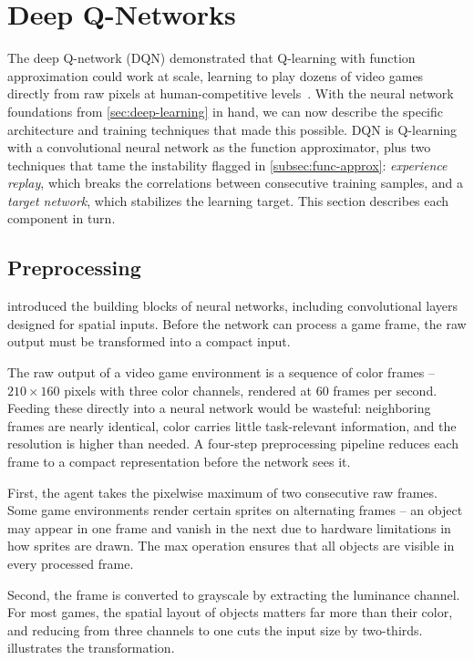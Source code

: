 \section{Deep Q-Networks}
\label{sec:dqn}

The deep Q-network (DQN) demonstrated that Q-learning with
function approximation could work at scale, learning to play
dozens of video games directly from raw pixels at
human-competitive levels~\citep{mnih2015human}. With the neural
network foundations from \cref{sec:deep-learning} in hand, we can
now describe the specific architecture and training techniques
that made this possible. DQN is Q-learning with a convolutional
neural network as the function approximator, plus two techniques
that tame the instability flagged in \cref{subsec:func-approx}:
\emph{experience replay}, which breaks the correlations between
consecutive training samples, and a \emph{target network}, which
stabilizes the learning target. This section describes each
component in turn.

\subsection{Preprocessing}
\label{subsec:preprocessing}

 introduced the building blocks of neural
networks, including convolutional layers designed for spatial
inputs. Before the network can process a game frame, the raw
output must be transformed into a compact input.

\smallskip
The raw output of a video game environment is a sequence of color
frames -- $210 \times 160$ pixels with three color channels, rendered
at 60 frames per second. Feeding these directly into a neural network
would be wasteful: neighboring frames are nearly identical, color
carries little task-relevant information, and the resolution is
higher than needed. A four-step preprocessing pipeline reduces each
frame to a compact representation before the network sees it.

\smallskip
First, the agent takes the pixelwise maximum of two consecutive raw
frames. Some game environments render certain sprites on alternating
frames -- an object may appear in one frame and vanish in the next
due to hardware limitations in how sprites are drawn. The max
operation ensures that all objects are visible in every processed
frame.

\smallskip
Second, the frame is converted to grayscale by extracting the
luminance channel. For most games, the spatial layout of objects
matters far more than their color, and reducing from three channels
to one cuts the input size by two-thirds.
 illustrates the transformation.

